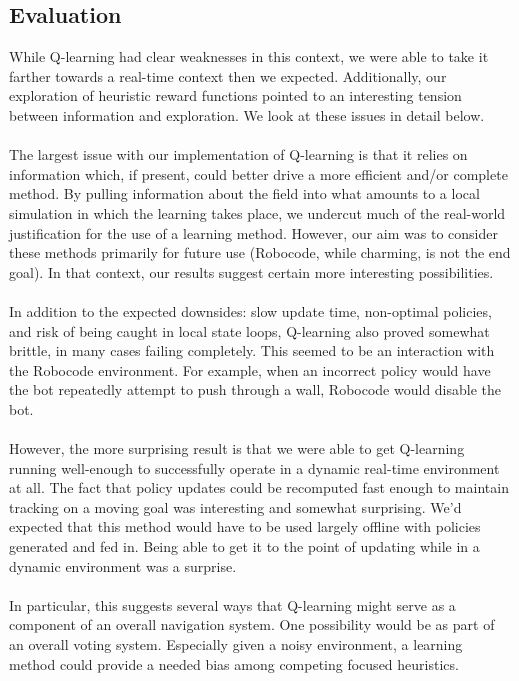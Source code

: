 \documentclass{aiaa-tc}%
\begin{document}
\subsection{Evaluation}
While Q-learning had clear weaknesses in this context, we were able to take it farther towards a real-time context then we expected. Additionally, our exploration of heuristic reward functions pointed to an interesting tension between information and exploration. We look at these issues in detail below. \\ \\
The largest issue with our implementation of Q-learning is that it
relies on information which, if present, could better drive a more
efficient and/or complete method. By pulling information about the
field into what amounts to a local simulation in which the learning
takes place, we undercut much of the real-world justification for the
use of a learning method. However, our aim was to consider these
methods primarily for future use (Robocode, while charming, is not the
end goal). In that context, our results suggest certain
more interesting possibilities. \\ \\
In addition to the expected downsides: slow update time, non-optimal policies, and risk of being caught in
local state loops, Q-learning also proved somewhat brittle, in
many cases failing completely. This seemed to be an interaction with
the Robocode environment. For example, when an incorrect policy would
have the bot repeatedly attempt to push through a wall, Robocode would
disable the bot. \\ \\
However, the more surprising
result is that we were able to get Q-learning running well-enough to
successfully operate in a dynamic real-time environment at all. The
fact that policy updates could be recomputed fast enough to
maintain tracking on a moving goal was interesting and somewhat
surprising. We'd expected that this method would have to be used
largely offline with policies generated and fed in. Being able to get
it to the point of updating while in a dynamic environment was a surprise. \\ \\
In particular, this suggests several ways that Q-learning might serve as a
component of an overall navigation system. One possibility would be as
part of an overall voting system. Especially given a noisy
environment, a learning method could provide a needed bias among
competing focused heuristics. \\ \\
\end{document}
